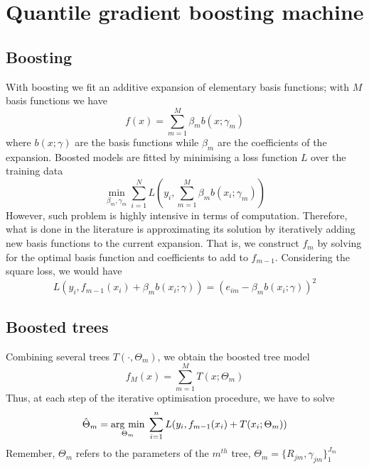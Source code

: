\section{Quantile gradient boosting machine}
\subsection{Boosting}
With boosting we fit an additive expansion of elementary basis functions; with $M$ basis functions we have 
\begin{equation}
    f(x)=\sum\limits_{m=1}^{M}\beta_m b(x;\gamma_m)
\end{equation}
where $b(x;\gamma)$ are the basis functions while $\beta_m$ are the coefficients of the expansion.
Boosted models are fitted by minimising a loss function $L$ over the training data
\begin{equation}
    \min_{\beta_m, \gamma_m}\sum\limits_{i=1}^{N}L\left(y_i, \sum\limits_{m=1}^M \beta_m b(x_i;\gamma_m)\right)
\end{equation}
However, such problem is highly intensive in terms of computation. Therefore, what is done in the literature is approximating its solution by iteratively adding new basis functions to the current expansion. That is, we construct $f_m$ by solving for the optimal basis function and coefficients to add to $f_{m-1}$. Considering the square loss, we would have
\begin{equation}
    L(y_i, f_{m-1}(x_i)+\beta_m b(x_i;\gamma))=(e_{im}-\beta_m b(x_i;\gamma))^2
\end{equation}

\subsection{Boosted trees}
Combining several trees $T(\cdot, \Theta_m)$, we obtain the boosted tree model
\begin{equation}
    f_M(x)=\sum\limits_{m=1}^M T(x;\Theta_m)
\end{equation}
Thus, at each step of the iterative optimisation procedure, we have to solve
\begin{equation}\label{boosting_minimisation_problem}
    \hat{\Theta}_m=\underset{\Theta_m}{\operatorname{arg}\,\operatorname{min}}\;\sum\limits_{i=1}^{n}L(y_i, f_{m-1}(x_i)+T(x_i;\Theta_m))
\end{equation}
Remember, $\Theta_m$ refers to the parameters of the $m^{th}$ tree, $\Theta_m=\{R_{jm}, \gamma_{jm}\}_1^{J_m}$
